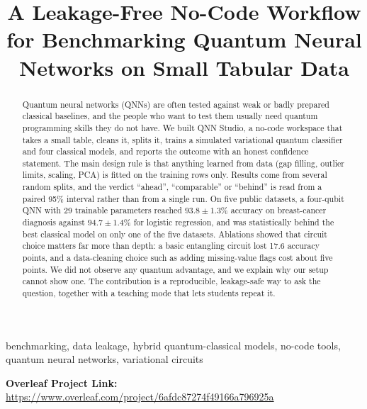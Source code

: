 \documentclass[conference]{IEEEtran}
\begin{document}
\title{A Leakage-Free No-Code Workflow for Benchmarking Quantum Neural Networks on Small Tabular Data}

\author{
}

\maketitle

\begin{abstract}
Quantum neural networks (QNNs) are often tested against weak or badly prepared classical baselines, and the people who want to test them usually need quantum programming skills they do not have. We built QNN Studio, a no-code workspace that takes a small table, cleans it, splits it, trains a simulated variational quantum classifier and four classical models, and reports the outcome with an honest confidence statement. The main design rule is that anything learned from data (gap filling, outlier limits, scaling, PCA) is fitted on the training rows only. Results come from several random splits, and the verdict ``ahead'', ``comparable'' or ``behind'' is read from a paired 95\% interval rather than from a single run. On five public datasets, a four-qubit QNN with 29 trainable parameters reached $93.8\pm1.3\%$ accuracy on breast-cancer diagnosis against $94.7\pm1.4\%$ for logistic regression, and was statistically behind the best classical model on only one of the five datasets. Ablations showed that circuit choice matters far more than depth: a basic entangling circuit lost 17.6 accuracy points, and a data-cleaning choice such as adding missing-value flags cost about five points. We did not observe any quantum advantage, and we explain why our setup cannot show one. The contribution is a reproducible, leakage-safe way to ask the question, together with a teaching mode that lets students repeat it.
\end{abstract}

\begin{IEEEkeywords}
benchmarking, data leakage, hybrid quantum-classical models, no-code tools, quantum neural networks, variational circuits
\end{IEEEkeywords}

\noindent\textbf{Overleaf Project Link:} \url{https://www.overleaf.com/project/6afdc87274f49166a796925a}
\end{document}
